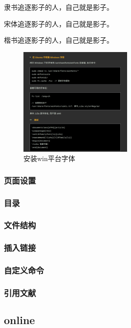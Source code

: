 \documentclass[11pt]{ctexart}
\newcommand{\lishu}{\CJKfamily{ls}}
\begin{document}
 {\lishu{} 隶书\qquad 追逐影子的人，自己就是影子。}
 
  {\songti{} 宋体\qquad 追逐影子的人，自己就是影子。}
  
   {\kaishu{} 楷书\qquad 追逐影子的人，自己就是影子。}
   
   
   \begin{figure}[ht]
   	\centering
   	\includegraphics[width=0.5\textwidth]{images/font.png}
   	\caption{安装win平台字体}
   	\label{fig:setfont}
   \end{figure}
 \subsubsection{页面设置}
 
 \subsubsection{目录}
 
 \subsubsection{文件结构}
 
 \subsubsection{插入链接}
 
 \subsubsection{自定义命令}
 
 \subsubsection{引用文献}
 
 \subsection{online}
 
\end{document}
